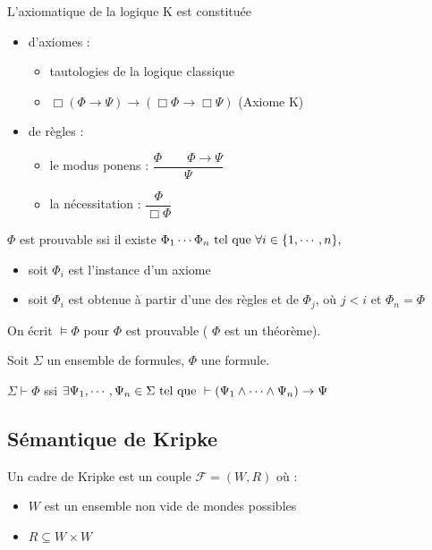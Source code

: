 \documentclass[10pt,a4paper]{article}
\newcommand{\F}{\mathcal{F}}
\begin{document}
\begin{definition}
 L'axiomatique de la logique K est constituée
\begin{itemize}
 \item d'axiomes : \begin{itemize}
                  \item tautologies de la logique classique
                  \item $\Box (\Phi \rightarrow \Psi) \rightarrow ( \Box \Phi \rightarrow \Box \Psi)$ (Axiome K) 
                 \end{itemize}
 \item de règles : \begin{itemize}
                 \item le modus ponens : $ \dfrac{ \Phi \qquad \Phi \rightarrow \Psi }{ \Psi}$
                 \item la nécessitation : $ \dfrac{ \Phi }{ \Box \Phi }$
                \end{itemize}
\end{itemize}
\end{definition}

\begin{definition}
 $\Phi$ est prouvable ssi il existe $ \Phi_1 \cdots \Phi_n \text{ tel que } \forall i \in \{1, \cdots , n \},$
\begin{itemize}
 \item soit $ \Phi_i$ est l'instance d'un axiome
 \item soit $ \Phi_i$  est obtenue à partir d'une des règles et de $ \Phi_j$, où $j < i$ et $ \Phi_n = \Phi$
\end{itemize}
On écrit $ \models \Phi$ pour $ \Phi$ est prouvable ( $ \Phi $ est un théorème).
\end{definition}

\begin{definition}[$\vdash$]
 Soit $ \Sigma$ un ensemble de formules, $ \Phi$ une formule. 

$ \Sigma \vdash \Phi$ ssi $ \exists \Psi_1, \cdots, \Psi_n \in \Sigma \text{ tel que } \\
\vdash ( \Psi_1 \wedge \cdots \wedge \Psi_n) \rightarrow \Psi$
\end{definition}

\subsection{Sémantique de Kripke}

\begin{definition}
 Un cadre de Kripke est un couple $\F = (W, R)$ où :
\begin{itemize}
 \item $W$ est un ensemble non vide de mondes possibles
 \item $ R \subseteq W \times W$
\end{itemize}
\end{definition}
\end{document}
